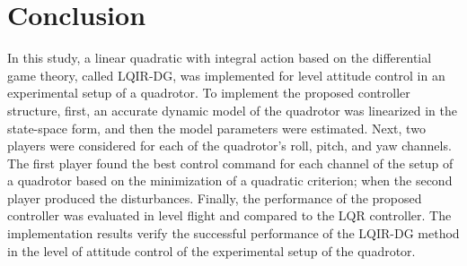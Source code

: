 \documentclass[conference]{IEEEtran}
\begin{document}
\section{Conclusion}
In this study, a linear quadratic with integral action based on the differential game theory, called LQIR-DG, was implemented for level attitude control in an experimental setup of a quadrotor. To implement the proposed controller structure, first, an accurate dynamic model of the quadrotor was linearized in the state-space form, and then the model parameters were estimated. Next, two players were considered for each of the quadrotor's roll, pitch, and yaw channels. The first player found the best control command for each channel of the setup of a quadrotor based on the minimization of a quadratic criterion; when the second player produced the disturbances. Finally, the performance of the proposed controller was evaluated in level flight and compared to the LQR controller. The implementation results verify the successful performance of the LQIR-DG method in the level of attitude control of the experimental setup of the quadrotor.










\end{document}
